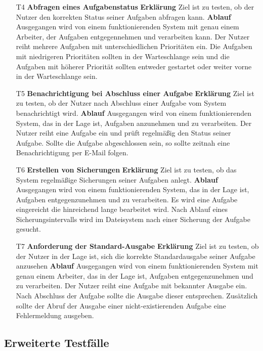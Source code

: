 \documentclass[a4paper,12pt]{article}
\begin{document}
\begin{itemize}
\item[T4] \textbf{Abfragen eines Aufgabenstatus }
\subitem \textbf{Erklärung} Ziel ist zu testen, ob der Nutzer den korrekten Status seiner Aufgaben abfragen kann.
\subitem \textbf{Ablauf} Ausgegangen wird von einem funktionierenden System mit genau einem Arbeiter, der Aufgaben entgegennehmen und verarbeiten kann.
Der Nutzer reiht mehrere Aufgaben mit unterschiedlichen Prioritäten ein. Die Aufgaben mit niedrigeren Prioritäten sollten in der Warteschlange sein und die Aufgaben mit höherer Priorität sollten entweder gestartet oder weiter vorne in der Warteschlange sein.

\item[T5] \textbf{Benachrichtigung bei Abschluss einer Aufgabe }
\subitem \textbf{Erklärung} Ziel ist zu testen, ob der Nutzer nach Abschluss einer Aufgabe vom System benachrichtigt wird.
\subitem \textbf{Ablauf} Ausgegangen wird von einem funktionierenden System, das in der Lage ist, Aufgaben anzunehmen und zu verarbeiten.
Der Nutzer reiht eine Aufgabe ein und prüft regelmäßig den Status seiner Aufgabe. Sollte die Aufgabe abgeschlossen sein, so sollte zeitnah eine Benachrichtigung per E-Mail folgen.

\item[T6] \textbf{Erstellen von Sicherungen}
\subitem \textbf{Erklärung} Ziel ist zu testen, ob das System regelmäßige Sicherungen seiner Aufgaben anlegt.
\subitem \textbf{Ablauf} Ausgegangen wird von einem funktionierenden System, das in der Lage ist, Aufgaben entgegenzunehmen und zu verarbeiten. Es wird eine Aufgabe eingereicht die hinreichend lange bearbeitet wird. Nach Ablauf eines Sicherungsintervalls wird im Dateisystem nach einer Sicherung der Aufgabe gesucht.

\item[T7] \textbf{Anforderung der Standard-Ausgabe }
\subitem \textbf{Erklärung} Ziel ist zu testen, ob der Nutzer in der Lage ist, sich die korrekte Standardausgabe seiner Aufgabe anzusehen
\subitem \textbf{Ablauf} Ausgegangen wird von einem funktionierenden System mit genau einem Arbeiter, das in der Lage ist, Aufgaben entgegenzunehmen und zu verarbeiten.
Der Nutzer reiht eine Aufgabe mit bekannter Ausgabe ein. Nach Abschluss der Aufgabe sollte die Ausgabe dieser entsprechen. Zusätzlich sollte der Abruf der Ausgabe einer nicht-existierenden Aufgabe eine Fehlermeldung ausgeben.
\end{itemize}

\subsection{Erweiterte Testfälle}
\end{document}
